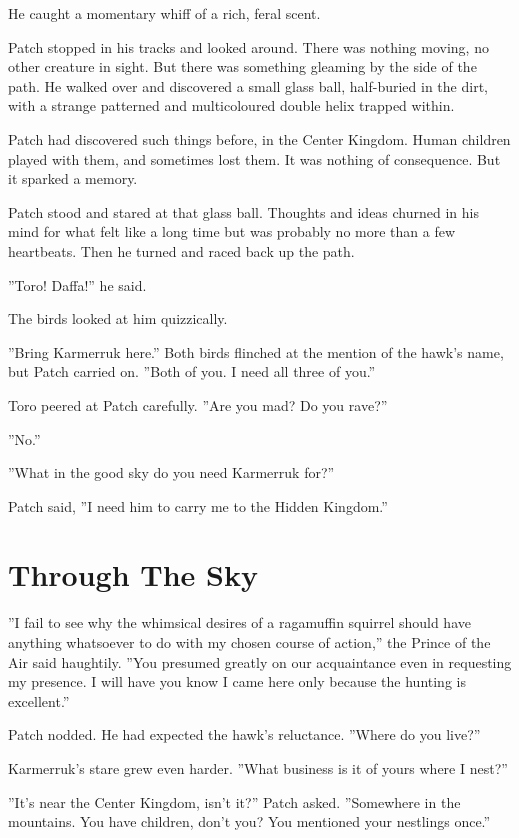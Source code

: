 \documentclass[12pt]{book}
\begin{document}
He caught a momentary whiff of a rich, feral scent.

Patch stopped in his tracks and looked around. There was nothing
moving, no other creature in sight. But there was something gleaming
by the side of the path. He walked over and discovered a small glass
ball, half-buried in the dirt, with a strange patterned and
multicoloured double helix trapped within.

Patch had discovered such things before, in the Center Kingdom. Human
children played with them, and sometimes lost them. It was nothing of
consequence. But it sparked a memory.

Patch stood and stared at that glass ball. Thoughts and ideas churned
in his mind for what felt like a long time but was probably no more
than a few heartbeats. Then he turned and raced back up the path.

''Toro! Daffa!'' he said.

The birds looked at him quizzically.

''Bring Karmerruk here.'' Both birds flinched at the mention of the
hawk's name, but Patch carried on. ''Both of you. I need all three of
you.''

Toro peered at Patch carefully. ''Are you mad? Do you rave?''

''No.''

''What in the good sky do you need Karmerruk for?''

Patch said, ''I need him to carry me to the Hidden Kingdom.''


\section{Through The Sky}

''I fail to see why the whimsical desires of a ragamuffin squirrel
should have anything whatsoever to do with my chosen course of
action,'' the Prince of the Air said haughtily. ''You presumed greatly
on our acquaintance even in requesting my presence. I will have you
know I came here only because the hunting is excellent.''

Patch nodded. He had expected the hawk's reluctance. ''Where do you
live?''

Karmerruk's stare grew even harder. ''What business is it of yours
where I nest?''

''It's near the Center Kingdom, isn't it?'' Patch asked. ''Somewhere
in the mountains. You have children, don't you? You mentioned your
nestlings once.''
\end{document}
